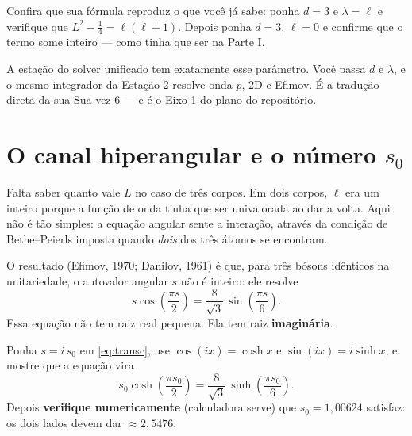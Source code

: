 \documentclass[11pt,a4paper]{article}
\begin{document}
\begin{suavez}
Confira que sua fórmula reproduz o que você já sabe: ponha $d=3$ e $\lambda=\ell$ e
verifique que $L^{2}-\tfrac14 = \ell(\ell+1)$. Depois ponha $d=3$, $\ell=0$ e confirme
que o termo some inteiro --- como tinha que ser na Parte I.

\vspace{1.6cm}
\hrulefill
\end{suavez}

\begin{ponte}
A estação do solver unificado tem exatamente esse parâmetro. Você passa $d$ e
$\lambda$, e o mesmo integrador da Estação 2 resolve onda-$p$, 2D e Efimov. É a
tradução direta da sua Sua vez 6 --- e é o Eixo 1 do plano do repositório.
\end{ponte}

\section{O canal hiperangular e o número \texorpdfstring{$s_{0}$}{s0}}

Falta saber quanto vale $L$ no caso de três corpos. Em dois corpos, $\ell$ era um
inteiro porque a função de onda tinha que ser univalorada ao dar a volta. Aqui não é
tão simples: a equação angular sente a interação, através da condição de
Bethe--Peierls imposta quando \emph{dois} dos três átomos se encontram.

O resultado (Efimov, 1970; Danilov, 1961) é que, para três bósons idênticos na
unitariedade, o autovalor angular $s$ não é inteiro: ele resolve
\begin{equation}
\boxed{\;s\cos\!\left(\frac{\pi s}{2}\right)
= \frac{8}{\sqrt3}\,\sin\!\left(\frac{\pi s}{6}\right).\;}
\label{eq:transc}
\end{equation}
Essa equação não tem raiz real pequena. Ela tem raiz \textbf{imaginária}.

\begin{suavez}
Ponha $s = i\,s_{0}$ em \eqref{eq:transc}, use
$\cos(ix)=\cosh x$ e $\sin(ix)=i\sinh x$, e mostre que a equação vira
\[
s_{0}\cosh\!\left(\frac{\pi s_{0}}{2}\right)
= \frac{8}{\sqrt3}\,\sinh\!\left(\frac{\pi s_{0}}{6}\right).
\]
Depois \textbf{verifique numericamente} (calculadora serve) que $s_{0}=1{,}00624$
satisfaz: os dois lados devem dar $\approx 2{,}5476$.

\vspace{2.2cm}
\hrulefill
\end{suavez}
\end{document}
